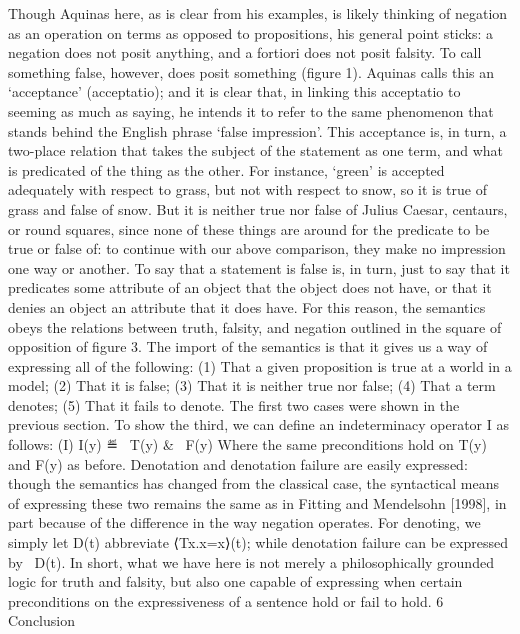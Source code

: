 \documentclass[]{article}
\begin{document}
Though Aquinas here, as is clear from his examples, is likely thinking of negation as an operation on terms as opposed to propositions, his general point sticks: a negation does not posit anything, and a fortiori does not posit falsity. To call something false, however, does posit something (figure 1). Aquinas calls this an ‘acceptance’ (acceptatio); and it is clear that, in linking this acceptatio to seeming as much as saying, he intends it to refer to the same phenomenon that stands behind the English phrase ‘false impression’. This acceptance is, in turn, a two-place relation that takes the subject of the statement as one term, and what is predicated of the thing as the other. For instance, ‘green’ is accepted adequately with respect to grass, but not with respect to snow, so it is true of grass and false of snow. But it is neither true nor false of Julius Caesar, centaurs, or round squares, since none of these things are around for the predicate to be true or false of: to continue with our above comparison, they make no impression one way or another. To say that a statement is false is, in turn, just to say that it predicates some attribute of an object that the object does not have, or that it denies an object an attribute that it does have.
For this reason, the semantics obeys the relations between truth, falsity, and negation outlined in the square of opposition of figure 3. 
The import of the semantics is that it gives us a way of expressing all of the following:
(1)	That a given proposition is true at a world in a model; 
(2)	That it is false;
(3)	That it is neither true nor false;
(4)	That a term denotes;
(5)	That it fails to denote.
The first two cases were shown in the previous section. To show the third, we can define an indeterminacy operator I as follows:
(I)	I(y) ≝ ~T(y) & ~F(y)
Where the same preconditions hold on T(y) and F(y) as before. 
Denotation and denotation failure are easily expressed: though the semantics has changed from the classical case, the syntactical means of expressing these two remains the same as in Fitting and Mendelsohn [1998], in part because of the difference in the way negation operates. For denoting, we simply let D(t) abbreviate ⟨Tx.x=x⟩(t); while denotation failure can be expressed by ~D(t).
In short, what we have here is not merely a philosophically grounded logic for truth and falsity, but also one capable of expressing when certain preconditions on the expressiveness of a sentence hold or fail to hold. 
6 Conclusion
\end{document}

